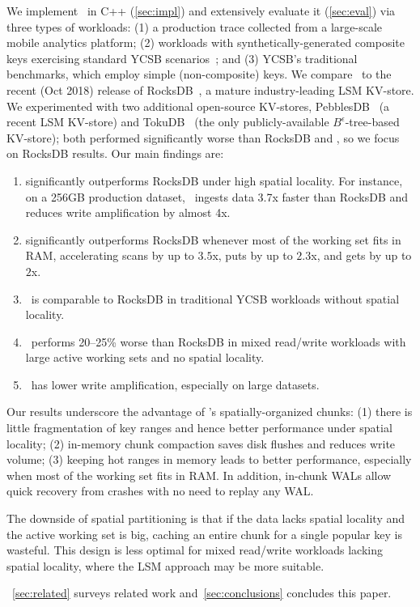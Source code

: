 We implement \sys\ in  C++ (\cref{sec:impl}) and extensively evaluate it (\cref{sec:eval})
via three types of workloads: (1) a production trace collected from a large-scale mobile analytics platform; 
(2)  workloads with synthetically-generated composite keys exercising  standard YCSB scenarios~\cite{YCSB};
and (3)  YCSB's traditional benchmarks, which employ simple (non-composite) keys.  
We compare \sys\ to the recent (Oct 2018) release of RocksDB~\cite{RocksDB}, a mature industry-leading LSM KV-store. 
We  experimented with two additional open-source KV-stores, PebblesDB~\cite{PebblesDB} (a recent LSM KV-store) and  
TokuDB~\cite{TokuDB} (the only publicly-available $B^{\epsilon}$-tree-based 
KV-store); both performed significantly worse than  RocksDB and \sys, so we focus on RocksDB results. 
Our main findings are: 
\begin{enumerate} 
\item \sys\/ significantly outperforms RocksDB under high spatial  locality.  
For instance, on a 256GB production dataset, \sys\ ingests data 3.7x faster than RocksDB %
and reduces write amplification by almost 4x. 
\item \sys\/ significantly outperforms RocksDB whenever most of the working set fits in RAM, 
accelerating scans by up to $3.5$x, puts by up to $2.3$x, and gets by up to $2$x. 
\item \sys\ is comparable to RocksDB in traditional YCSB workloads without spatial locality. 
\item \sys\ performs 20--25\% worse  than RocksDB  in mixed read/write workloads with large active working sets and no spatial locality. 
\item \sys\ has lower write amplification, especially on large datasets.  
\end{enumerate}

Our results underscore the advantage of \sys's spatially-organized chunks:
(1) there is little fragmentation of key ranges and hence better  performance under spatial locality; 
(2) in-memory chunk compaction saves disk flushes and reduces write volume;  
(3) keeping hot ranges in memory leads to better performance, especially when most of the working set fits in RAM.
In addition, in-chunk WALs  allow quick recovery from crashes with no need to replay any WAL.

The downside of spatial partitioning is that if the data lacks spatial locality and the active working set is big, 
caching an entire chunk for a single popular key is wasteful.  This design is less optimal for mixed read/write workloads lacking spatial locality, where the LSM approach may be more suitable.  

~\cref{sec:related}  surveys related work and~\cref{sec:conclusions} concludes this paper. 
